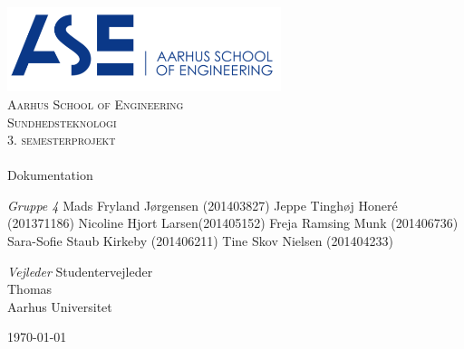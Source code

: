 \begin{titlingpage}
\begin{center}

~ \\[3cm]

\includegraphics[width=0.6\textwidth]{figurer/ASE}~\\[1cm]

\textsc{\LARGE Aarhus School of Engineering}\\[1.5cm]

\textsc{\Large Sundhedsteknologi}\\
\textsc{\Large 3. semesterprojekt}\\[0.5cm]

\noindent\makebox[\linewidth]{\rule{\textwidth}{0.4pt}}\\
[0.5cm]{\Huge Dokumentation}
\noindent\makebox[\linewidth]{\rule{\textwidth}{0.4pt}}

\end{center}

\textit{Gruppe 4} \newline
Mads Fryland J\o rgensen (201403827) \newline
Jeppe Tinghøj Honeré (201371186) \newline
Nicoline Hjort Larsen(201405152) \newline
Freja Ramsing Munk (201406736) \newline		 
Sara-Sofie Staub Kirkeby (201406211) \newline
Tine Skov Nielsen (201404233) \newline



\textit{Vejleder} \newline
Studentervejleder\\
Thomas\\
Aarhus Universitet


\vfill

\begin{center}
{\large \today}
\end{center}


\end{titlingpage}